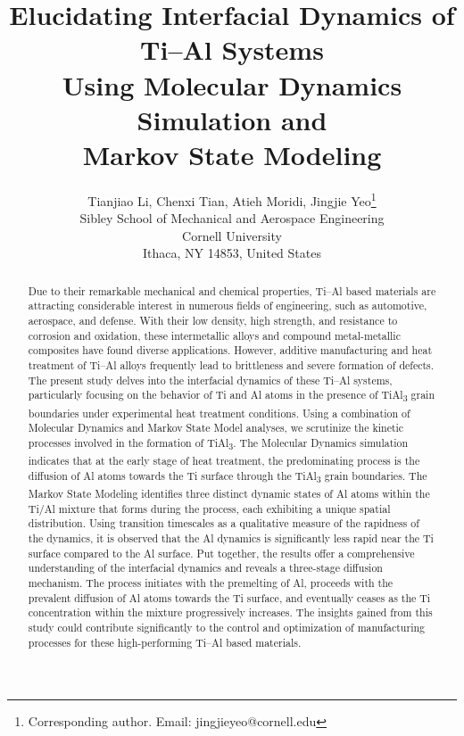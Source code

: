 \documentclass{article}
\title{Elucidating Interfacial Dynamics of Ti--Al Systems \\ Using Molecular Dynamics Simulation and \\ Markov State Modeling
}
\author{
  Tianjiao Li, Chenxi Tian, Atieh Moridi, Jingjie Yeo\thanks{Corresponding author. Email: jingjieyeo@cornell.edu} \\
  Sibley School of Mechanical and Aerospace Engineering \\
  Cornell University \\ 
  Ithaca, NY 14853, United States\\
}
\begin{document}
\maketitle

\begin{abstract}
Due to their remarkable mechanical and chemical properties, Ti--Al based materials are attracting considerable interest in numerous fields of engineering, such as automotive, aerospace, and defense. With their low density, high strength, and resistance to corrosion and oxidation, these intermetallic alloys and compound metal-metallic composites have found diverse applications. However, additive manufacturing and heat treatment of Ti–Al alloys frequently lead to brittleness and severe formation of defects. The present study delves into the interfacial dynamics of these Ti--Al systems, particularly focusing on the behavior of Ti and Al atoms in the presence of TiAl\textsubscript{3} grain boundaries under experimental heat treatment conditions. Using a combination of Molecular Dynamics and Markov State Model analyses, we scrutinize the kinetic processes involved in the formation of TiAl\textsubscript{3}. The Molecular Dynamics simulation indicates that at the early stage of heat treatment, the predominating process is the diffusion of Al atoms towards the Ti surface through the TiAl\textsubscript{3} grain boundaries. The Markov State Modeling identifies three distinct dynamic states of Al atoms within the Ti/Al mixture that forms during the process, each exhibiting a unique spatial distribution. Using transition timescales as a qualitative measure of the rapidness of the dynamics, it is observed that the Al dynamics is significantly less rapid near the Ti surface compared to the Al surface. Put together, the results offer a comprehensive understanding of the interfacial dynamics and reveals a three-stage diffusion mechanism. The process initiates with the premelting of Al, proceeds with the prevalent diffusion of Al atoms towards the Ti surface, and eventually ceases as the Ti concentration within the mixture progressively increases. The insights gained from this study could contribute significantly to the control and optimization of manufacturing processes for these high-performing Ti--Al based materials.
\end{abstract}


\end{document}

